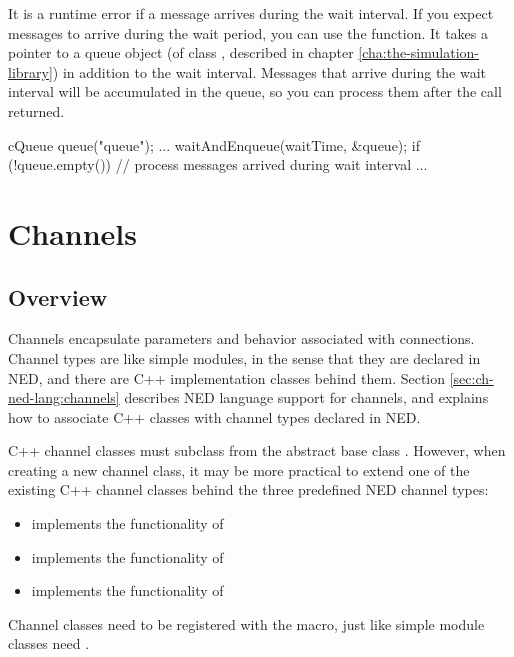 It is a runtime error if a message arrives during the wait interval.
If you expect messages to arrive during the wait period, you can
use the  function. It takes a pointer to a queue object
(of class , described in chapter \ref{cha:the-simulation-library})
in addition to the wait interval. Messages that arrive during the
wait interval will be accumulated in the queue, so you can
process them after the  call returned.

\begin{cpp}
cQueue queue("queue");
...
waitAndEnqueue(waitTime, &queue);
if (!queue.empty())
{
    // process messages arrived during wait interval
    ...
}
\end{cpp}


\section{Channels}
\label{sec:simple-modules:channels}

\subsection{Overview}

Channels encapsulate parameters and behavior associated with connections.
Channel types are like simple modules, in the sense that they are declared
in NED, and there are C++ implementation classes behind them. Section
\ref{sec:ch-ned-lang:channels} describes NED language support for channels,
and explains how to associate C++ classes with channel types declared in
NED.

C++ channel classes must subclass from the abstract base class
. However, when creating a new channel class, it may be
more practical to extend one of the existing C++ channel classes behind the
three predefined NED channel types:

\begin{itemize}
  \item {} implements the functionality of 
  \item {} implements the functionality of 
  \item {} implements the functionality of 
\end{itemize}

Channel classes need to be registered with the  macro,
just like simple module classes need .

